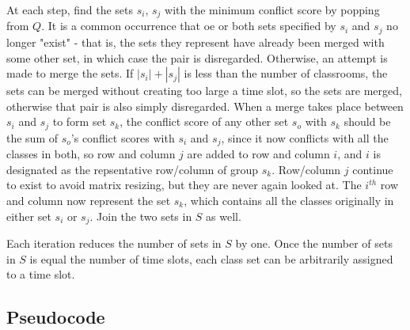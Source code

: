 \documentclass[11pt, oneside]{article}   	%
\begin{document}
At each step, find the sets $s_i$, $s_j$ with the minimum conflict score by popping from $Q$. It is a common occurrence that oe or both sets specified by $s_i$ and $s_j$ no longer "exist" - that is, the sets they represent have already been merged with some other set, in which case the pair is disregarded. Otherwise, an attempt is made to merge the sets. If $|s_i| + |s_j|$ is less than the number of classrooms, the sets can be merged without creating too large a time slot, so the sets are merged, otherwise that pair is also simply disregarded. When a merge takes place between $s_i$ and $s_j$ to form set $s_k$, the conflict score of any other set $s_o$ with $s_k$ should be the sum of $s_o$'s conflict scores with $s_i$ and $s_j$, since it now conflicts with all the classes in both, so row and column $j$ are added to row and column $i$, and $i$ is designated as the repsentative row/column of group $s_k$. Row/column $j$ continue to exist to avoid matrix resizing, but they are never again looked at. The $i^{th}$ row and column now represent the set $s_k$, which contains all the classes originally in either set $s_i$ or $s_j$. Join the two sets in $S$ as well.

Each iteration reduces the number of sets in $S$ by one. Once the number of sets in $S$ is equal the number of time slots, each class set can be arbitrarily assigned to a time slot.

\subsection{Pseudocode}
\begin{algorithm}
\end{algorithm}

\begin{algorithm}
\end{algorithm}
\end{document}
